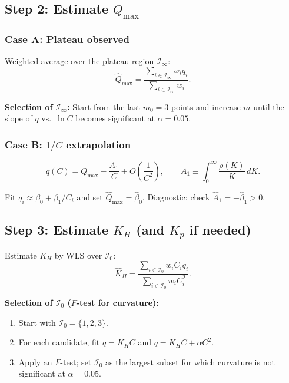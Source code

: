 \documentclass[12pt]{article}
\begin{document}
\subsection{Step 2: Estimate $Q_{\max}$}

\subsubsection{Case A: Plateau observed}

Weighted average over the plateau region $\mathcal{I}_\infty$:
\begin{equation}
  \widehat{Q}_{\max} =
  \frac{\sum_{i\in\mathcal{I}_\infty} w_i q_i}
       {\sum_{i\in\mathcal{I}_\infty} w_i}.
  \label{eq:Qmax_plateau}
\end{equation}

\textbf{Selection of $\mathcal{I}_\infty$:}
Start from the last $m_0=3$ points and increase $m$ until the slope of
$q$ vs.\ $\ln C$ becomes significant at $\alpha=0.05$.

\subsubsection{Case B: $1/C$ extrapolation}

\begin{equation}
  q(C) = Q_{\max} - \frac{A_1}{C} + O\!\left(\frac{1}{C^2}\right),
  \qquad
  A_1 \equiv \int_0^\infty \frac{\rho(K)}{K}\,dK.
  \label{eq:highC_expansion}
\end{equation}

Fit $q_i \approx \beta_0 + \beta_1/C_i$ and set
$\widehat{Q}_{\max}=\widehat{\beta}_0$.
Diagnostic: check $\widehat{A}_1=-\widehat{\beta}_1 > 0$.

\subsection{Step 3: Estimate $K_H$ (and $K_p$ if needed)}

Estimate $K_H$ by WLS over $\mathcal{I}_0$:
\begin{equation}
  \widehat{K}_H =
  \frac{\sum_{i\in\mathcal{I}_0} w_i C_i q_i}
       {\sum_{i\in\mathcal{I}_0} w_i C_i^2}.
  \label{eq:KH_fit}
\end{equation}

\textbf{Selection of $\mathcal{I}_0$ ($F$-test for curvature):}
\begin{enumerate}[nosep]
  \item Start with $\mathcal{I}_0=\{1,2,3\}$.
  \item For each candidate, fit $q=K_H C$ and $q=K_H C + \alpha C^2$.
  \item Apply an $F$-test; set $\mathcal{I}_0$ as the largest subset for
        which curvature is not significant at $\alpha=0.05$.
\end{enumerate}
\end{document}
